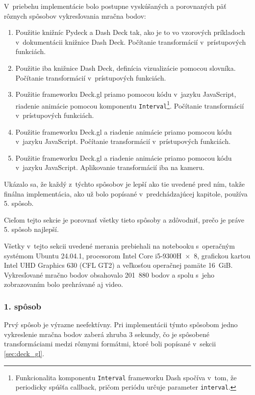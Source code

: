 V~priebehu implementácie bolo postupne vyskúšaných a porovnaných päť rôznych spôsobov vykresľovania mračna bodov:
\begin{enumerate}
    \item Použitie knižníc Pydeck a Dash Deck tak, ako je to vo vzorových príkladoch v~dokumentácii knižnice Dash Deck. Počítanie transformácií v~prístupových funkciách.
    \item Použitie iba knižnice Dash Deck, definícia vizualizácie pomocou slovníka. Počítanie transformácií v~prístupových funkciách.
    \item Použitie frameworku Deck.gl priamo pomocou kódu v~jazyku JavaScript, riadenie animácie pomocou komponentu \texttt{Interval}\footnote{Funkcionalita komponentu \texttt{Interval} frameworku Dash spočíva v~tom, že periodicky spúšťa callback, pričom periódu určuje parameter \texttt{interval}.}. Počítanie transformácií v~prístupových funkciách. 
    \item Použitie frameworku Deck.gl a riadenie animácie priamo pomocou kódu v~jazyku JavaScript. Počítanie transformácií v~prístupových funkciách.
    \item Použitie frameworku Deck.gl a riadenie animácie priamo pomocou kódu v~jazyku JavaScript. Aplikovanie transformácií iba na kameru.
\end{enumerate}

Ukázalo sa, že každý z~týchto spôsobov je lepší ako tie uvedené pred ním, takže finálna implementácia, ako už bolo popísané v~predchádzajúcej kapitole, používa 5. spôsob.

Cieľom tejto sekcie je porovnať všetky tieto spôsoby a zdôvodniť, prečo je práve 5. spôsob najlepší.

Všetky v~tejto sekcii uvedené merania prebiehali na notebooku s~operačným systémom Ubuntu 24.04.1, procesorom Intel Core i5-9300H~×~8, grafickou kartou Intel UHD Graphics 630 (CFL GT2) a veľkosťou operačnej pamäte 16~GiB. Vykresľované mračno bodov obsahovalo 201~880 bodov a spolu s~jeho zobrazovaním bolo prehrávané aj video.

\subsubsection{1. spôsob}

Prvý spôsob je výrazne neefektívny. Pri implementácii týmto spôsobom jedno vykreslenie mračna bodov zaberá zhruba 3 sekundy, čo je spôsobené transformáciami medzi rôznymi formátmi, ktoré boli popísané v~sekcii \ref{sec:deck_gl}.

